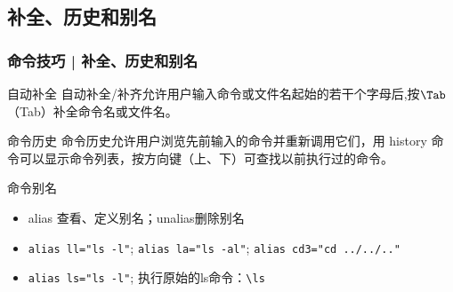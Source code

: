 \subsection{补全、历史和别名}
\begin{frame}[fragile]
  \frametitle{命令技巧 | 补全、历史和别名}
  \begin{block}{自动补全}
    自动补全/补齐允许用户输入命令或文件名起始的若干个字母后,按$\Tab$（\alert{Tab}）补全命令名或文件名。
  \end{block}
  \pause
  \begin{block}{命令历史}
    命令历史允许用户浏览先前输入的命令并重新调用它们，用 \alert{history} 命令可以显示命令列表，按方向键（上、下）可查找以前执行过的命令。
  \end{block}
  \pause
  \begin{block}{命令别名}
    \begin{itemize}
      \item \alert{alias} 查看、定义别名；unalias删除别名
      \item \verb|alias ll="ls -l"|; \quad \verb|alias la="ls -al"|; \verb|alias cd3="cd ../../.."|
      \item \verb|alias ls="ls -l"|; 执行原始的ls命令：\verb|\ls|
    \end{itemize}
  \end{block}
\end{frame}

